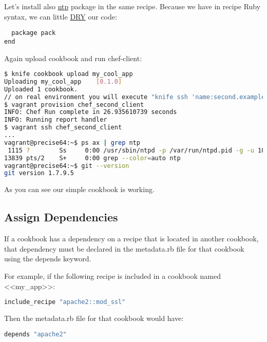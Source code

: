 Let's install also \href{http://en.wikipedia.org/wiki/Network\_Time\_Protocol}{ntp} package in the same recipe. Because we have in recipe Ruby syntax, we can little \href{http://ru.wikipedia.org/wiki/Dont\_repeat\_yourself}{DRY} our code:

\begin{lstlisting}[label=lst:cookbook-recipes4,title=my-server-cloud/site-cookbooks/my\_cool\_app/recipes/default.rb]
%w(git ntp).each do |pack|
  package pack
end
\end{lstlisting}

Again upload cookbook and run chef-client:

\begin{lstlisting}[language=Bash,label=lst:cookbook-recipes5]
$ knife cookbook upload my_cool_app
Uploading my_cool_app    [0.1.0]
Uploaded 1 cookbook.
// on real environment you will execute "knife ssh 'name:second.example.com' 'sudo chef-client' -i ../keys/production.pem -x ubuntu"
$ vagrant provision chef_second_client
INFO: Chef Run complete in 26.935610739 seconds
INFO: Running report handler
$ vagrant ssh chef_second_client
...
vagrant@precise64:~$ ps ax | grep ntp
 1115 ?        Ss     0:00 /usr/sbin/ntpd -p /var/run/ntpd.pid -g -u 103:108
13839 pts/2    S+     0:00 grep --color=auto ntp
vagrant@precise64:~$ git --version
git version 1.7.9.5
\end{lstlisting}

As you can see our simple cookbook is working.


\subsection{Assign Dependencies}

If a cookbook has a dependency on a recipe that is located in another cookbook, that dependency must be declared in the metadata.rb file for that cookbook using the depends keyword.

For example, if the following recipe is included in a cookbook named <<my\_app>>:

\begin{lstlisting}[language=Bash,label=lst:cookbook-recipes6]
include_recipe "apache2::mod_ssl"
\end{lstlisting}

Then the metadata.rb file for that cookbook would have:

\begin{lstlisting}[language=Bash,label=lst:cookbook-recipes7]
depends "apache2"
\end{lstlisting}

